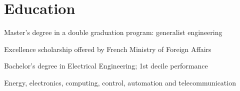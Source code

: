 \documentclass[]{deedy-resume}
\begin{document}
\begin{minipage}[t]{0.66\textwidth}
\section{Education}

\vspace{\topsep}
\begin{tightemize}\item Master's degree in a double graduation program: generalist engineering
\item Excellence scholarship offered by French Ministry of Foreign Affairs
\end{tightemize}
\sectionsep

\begin{tightemize}\item Bachelor's degree in Electrical Engineering; 1st decile performance
\item Energy, electronics, computing, control, automation and telecommunication
\end{tightemize}
\sectionsep


\end{minipage} 
\end{document}
